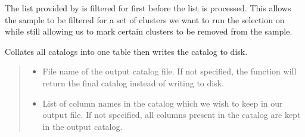 \documentclass[letterpaper,12pt,english]{sphinxmanual}
\begin{document}
\begin{fulllineitems}
\begin{fulllineitems}
\sphinxAtStartPar
The list provided by  is filtered for first before the  list is processed. This allows the
sample to be filtered for a set of clusters we want to run the selection on while still allowing us to mark
certain clusters to be removed from the sample.

\end{fulllineitems}


\begin{fulllineitems}
\label{\detokenize{api/selector:SPTclIRAGN.Pipeline_functions.SelectIRAGN.final_catalogs}}
\pysigstartsignatures
{}
\pysigstopsignatures
\sphinxAtStartPar
Collates all catalogs into one table then writes the catalog to disk.
\begin{quote}\begin{description}
\begin{itemize}
\item {} 
\sphinxAtStartPar
{} \textendash{} File name of the output catalog file. If not specified, the function will return the final catalog instead
of writing to disk.

\item {} 
\sphinxAtStartPar
{} \textendash{} List of column names in the catalog which we wish to keep in our output file. If not specified, all columns
present in the catalog are kept in the output catalog.


\end{itemize}
\end{description}
\end{quote}
\end{fulllineitems}
\end{fulllineitems}
\end{document}
